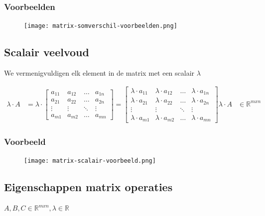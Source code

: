 \documentclass{article}
\begin{document}
\subsubsection{Voorbeelden}

\begin{figure}[H]
    \centering
    \texttt{[image: matrix-somverschil-voorbeelden.png]}
\end{figure}

\subsection{Scalair veelvoud}

We vermenigvuldigen elk element in de matrix met een scalair $\lambda$

\begin{align*}
\lambda \cdot A & = \lambda \cdot 
\begin{bmatrix}
    a_{11} & a_{12} & \dots & a_{1n}\\
    a_{21} & a_{22} & \dots & a_{2n}\\
    \vdots & \vdots & \ddots & \vdots\\
    a_{m1} & a_{m2} & \dots & a_{mn}
\end{bmatrix} =
\begin{bmatrix}
    \lambda\cdot a_{11} & \lambda\cdot a_{12} & \dots & \lambda\cdot a_{1n}\\
    \lambda\cdot a_{21} & \lambda\cdot a_{22} & \dots & \lambda\cdot a_{2n}\\
    \vdots & \vdots & \ddots & \vdots\\
    \lambda\cdot a_{m1} & \lambda\cdot a_{m2} & \dots & \lambda\cdot a_{mn}
\end{bmatrix}
\lambda \cdot A & \in \mathbb{R}^{mxn}
\end{align*}

\subsubsection{Voorbeeld}

\begin{figure}[H]
    \centering
    \texttt{[image: matrix-scalair-voorbeeld.png]}
\end{figure}


\subsection{Eigenschappen matrix operaties}

$A, B, C \in \mathbb{R}^{mxn}, \lambda \in \mathbb{R}$
\end{document}
